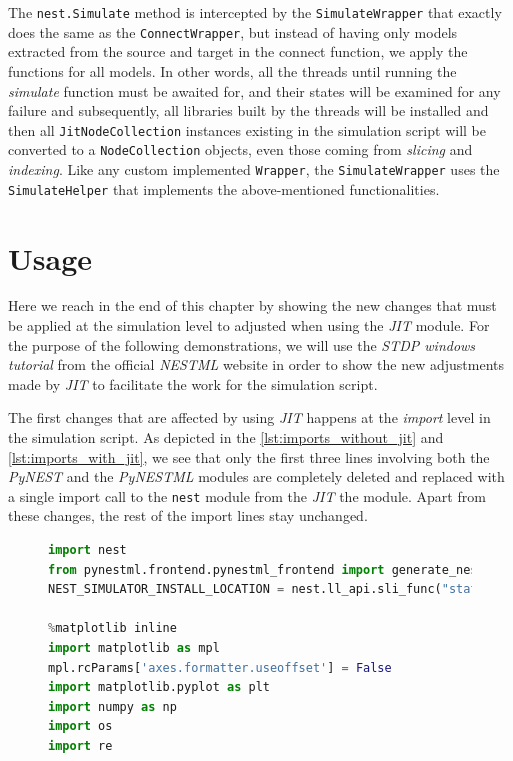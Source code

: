 The \texttt{nest.Simulate} method is intercepted by the \texttt{SimulateWrapper} that exactly does the same as the \texttt{ConnectWrapper}, but instead of having only models extracted from the source and target in the connect function, we apply the functions for all models. In other words, all the threads until running the \emph{simulate} function must be awaited for, and their states will be examined for any failure and subsequently, all libraries built by the threads will be installed and then all \texttt{JitNodeCollection} instances existing in the simulation script will be converted to a \texttt{NodeCollection} objects, even those coming from \emph{slicing} and \emph{indexing}. Like any custom implemented \texttt{Wrapper}, the \texttt{SimulateWrapper} uses the \texttt{SimulateHelper} that implements the above-mentioned functionalities.






\section{Usage}

Here we reach in the end of this chapter by showing the new changes that must be applied at the simulation level to adjusted when using the \emph{JIT} module.
For the purpose of the following demonstrations, we will use the \emph{STDP windows tutorial} from the official \emph{NESTML} website in order to show the new adjustments made by \emph{JIT} to facilitate the work for the simulation script.

 

The first changes that  are affected by using \emph{JIT} happens at the \emph{import} level in the simulation script. As depicted in the \autoref{lst:imports_without_jit} and \autoref{lst:imports_with_jit}, we see that only the first three lines involving both the \emph{PyNEST} and the \emph{PyNESTML} modules are completely deleted and replaced with a single import call to the \texttt{nest} module from the \emph{JIT} the module. Apart from these changes, the rest of the import lines stay unchanged. 

\begin{figure}[ht!]
\centering
\begin{lstlisting}[language=Python, label=lst:imports_without_jit, caption={The Simulation script imports without JIT}]
import nest
from pynestml.frontend.pynestml_frontend import generate_nest_target
NEST_SIMULATOR_INSTALL_LOCATION = nest.ll_api.sli_func("statusdict/prefix ::")

%matplotlib inline
import matplotlib as mpl
mpl.rcParams['axes.formatter.useoffset'] = False
import matplotlib.pyplot as plt
import numpy as np
import os
import re

\end{lstlisting}
\end{figure}

